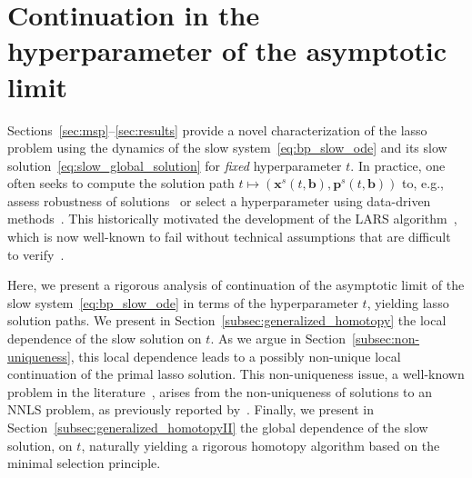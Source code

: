 \documentclass[11pt]{article}
\numberwithin{prop}{section}
\numberwithin{lem}{section}
\numberwithin{rem}{section}
\numberwithin{cor}{section}
\numberwithin{thm}{section}
\numberwithin{defn}{section}
\numberwithin{fact}{section}
\theoremstyle{plain}
\def\bb {\boldsymbol{b}}
\def\bp {\boldsymbol{p}}
\def\bx {\boldsymbol{x}}
\begin{document}
\section{Continuation in the hyperparameter of the asymptotic limit}\label{sec:perturbations}
Sections~\ref{sec:msp}--\ref{sec:results} provide a novel characterization of the lasso problem using the dynamics of the slow system~\eqref{eq:bp_slow_ode} and its slow solution~\eqref{eq:slow_global_solution} for \emph{fixed} hyperparameter $t$. In practice, one often seeks to compute the solution path $t \mapsto (\bx^{s}(t,\bb),\bp^{s}(t,\bb))$ to, e.g., assess robustness of solutions~\cite{donoho2006stability,fosson2020sparse} or select a hyperparameter using data-driven methods~\cite{friedman2010regularization,osborne2000new,efron2004least,donoho2008fast,bringmann2018homotopy}. This historically motivated the development of the LARS algorithm~\cite{osborne2000new,efron2004least}, which is now well-known to fail without technical assumptions that are difficult to verify~\cite[Proposition 4.1]{bringmann2018homotopy}.


Here, we present a rigorous analysis of continuation of the asymptotic limit of the slow system~\eqref{eq:bp_slow_ode} in terms of the hyperparameter $t$, yielding lasso solution paths. We present in Section~\ref{subsec:generalized_homotopy} the local dependence of the slow solution on $t$. As we argue in Section~\ref{subsec:non-uniqueness}, this local dependence leads to a possibly non-unique local continuation of the primal lasso solution. This non-uniqueness issue, a well-known problem in the literature~\cite{tibshirani2013lasso}, arises from the non-uniqueness of solutions to an NNLS problem, as previously reported by~\cite{bringmann2018homotopy}. Finally, we present in Section~\ref{subsec:generalized_homotopyII} the global dependence of the slow solution, on $t$, naturally yielding a rigorous homotopy algorithm based on the minimal selection principle.




\end{document}
